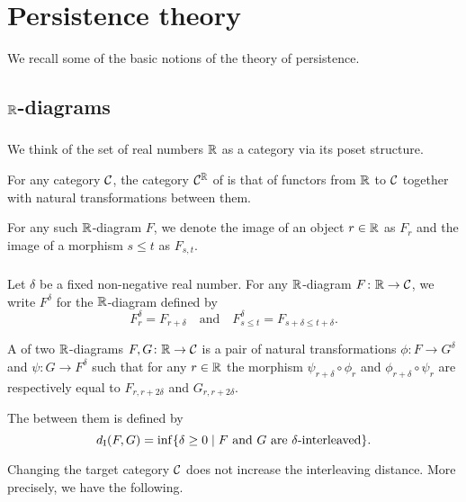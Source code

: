 
\section{Persistence theory}

We recall some of the basic notions of the theory of persistence.

\subsection{$\mathbb{R}$-diagrams}

\subsubsection{}
We think of the set of real numbers $\mathbb{R}$ as a category via its poset structure.

For any category $\mathcal{C}$, the category $\mathcal{C}^{\mathbb{R}}$ of  is that of functors from $\mathbb{R}$ to $\mathcal{C}$ together with natural transformations between them.

For any such $\mathbb{R}$-diagram $F$, we denote the image of an object $r \in \mathbb{R}$ as $F_r$ and the image of a morphism $s \leq t$ as $F_{s,t}$.

\subsubsection{}\label{ss:interleaving}
Let $\delta$ be a fixed non-negative real number.
For any $\mathbb{R}$-diagram $F \colon \mathbb{R} \to \mathcal{C}$, we write $F^\delta$ for the $\mathbb{R}$-diagram defined by
\[
F^\delta_r = F_{r+\delta}
\quad\text{and}\quad
F^\delta_{s \leq t} = F_{s+\delta \leq t+\delta}.
\]

A  of two $\mathbb{R}$-diagrams $F,G \colon \mathbb{R} \to \mathcal{C}$ is a pair of natural transformations
$\phi \colon F \to G^\delta$ and $\psi \colon G \to F^\delta$ such that for any $r \in \mathbb{R}$ the morphism $\psi_{r+\delta} \circ \phi_r$ and $\phi_{r+\delta} \circ \psi_r$ are respectively equal to $F_{r,r+2\delta}$ and $G_{r,r+2\delta}$.

The  between them is defined by
\[
d_{\mathrm{I}}(F, G) = \inf\{\delta \geq 0 \mid F \text{ and } G \text{ are } \delta\text{-interleaved}\}.
\]

Changing the target category $\mathcal{C}$ does not increase the interleaving distance.
More precisely, we have the following.

